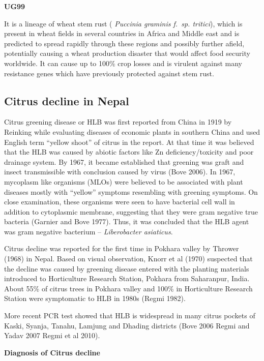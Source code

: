 \documentclass[
]{book}
\begin{document}
\textbf{UG99}

It is a lineage of wheat stem rust ( \emph{Puccinia graminis f.~sp. tritici}), which is present in wheat fields in several countries in Africa and Middle east and is predicted to spread rapidly through these regions and possibly further afield, potentially causing a wheat production disaster that would affect food security worldwide. It can cause up to 100\% crop losses and is virulent against many resistance genes which have previously protected against stem rust.

\hypertarget{citrus-decline-in-nepal}{%
\subsection{Citrus decline in Nepal}\label{citrus-decline-in-nepal}}

Citrus greening disease or HLB was first reported from China in 1919 by Reinking while evaluating diseases of economic plants in southern China and used English term ``yellow shoot'' of citrus in the report. At that time it was believed that the HLB was caused by abiotic factors like Zn deficiency/toxicity and poor drainage system. By 1967, it became established that greening was graft and insect transmissible with conclusion caused by virus (Bove 2006). In 1967, mycoplasm like organisms (MLOs) were believed to be associated with plant diseases mostly with ``yellow'' symptoms resembling with greening symptoms. On close examination, these organisms were seen to have bacterial cell wall in addition to cytoplasmic membrane, suggesting that they were gram negative true bacteria (Garnier and Bove 1977). Thus, it was concluded that the HLB agent was gram negative bacterium -- \emph{Liberobacter asiaticus}.

Citrus decline was reported for the first time in Pokhara valley by Thrower (1968) in Nepal. Based on visual observation, Knorr et al (1970) suspected that the decline was caused by greening disease entered with the planting materials introduced to Horticulture Research Station, Pokhara from Saharanpur, India. About 55\% of citrus trees in Pokhara valley and 100\% in Horticulture Research Station were symptomatic to HLB in 1980s (Regmi 1982).

More recent PCR test showed that HLB is widespread in many citrus pockets of Kaski, Syanja, Tanahu, Lamjung and Dhading districts (Bove 2006 Regmi and Yadav 2007 Regmi et al 2010).

\textbf{Diagnosis of Citrus decline}
\end{document}
